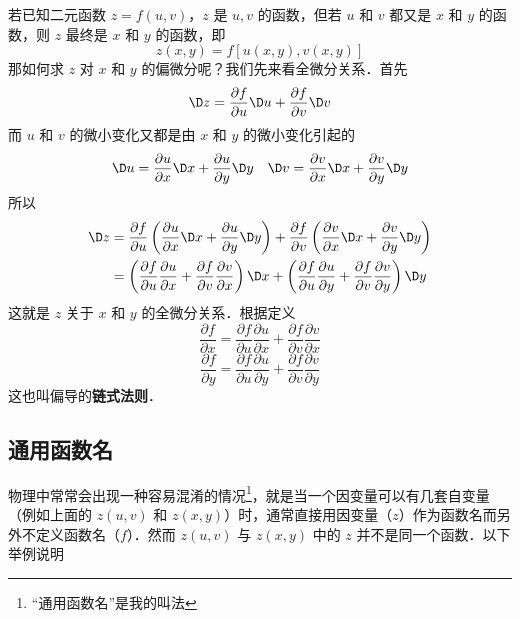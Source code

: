 
若已知二元函数 $z = f(u,v)$，$z$ 是 $u, v$ 的函数，但若 $u$ 和 $v$ 都又是 $x$ 和 $y$ 的函数，则 $z$ 最终是 $x$ 和 $y$ 的函数，即
\begin{equation}
z(x,y) = f[u(x,y),v(x,y)]
\end{equation}
那如何求 $z$ 对 $x$ 和 $y$ 的偏微分呢？我们先来看全微分关系．首先
\begin{equation}
\D z = \frac{{\partial f}}{{\partial u}}\D u + \frac{{\partial f}}{{\partial v}}\D v
\end{equation}
而 $u$ 和 $v$ 的微小变化又都是由 $x$ 和 $y$ 的微小变化引起的
\begin{equation}
\D u = \frac{{\partial u}}{{\partial x}}\D x + \frac{{\partial u}}{{\partial y}}\D y
\quad
\D v = \frac{{\partial v}}{{\partial x}}\D x + \frac{{\partial v}}{{\partial y}}\D y
\end{equation}
所以
\begin{equation}
\begin{aligned}
\D z &= \frac{{\partial f}}{{\partial u}}\left( {\frac{{\partial u}}{{\partial x}}\D x + \frac{{\partial u}}{{\partial y}}\D y} \right) + \frac{{\partial f}}{{\partial v}}\left( {\frac{{\partial v}}{{\partial x}}\D x + \frac{{\partial v}}{{\partial y}}\D y} \right) \hfill \\
   &= \left( {\frac{{\partial f}}{{\partial u}}\frac{{\partial u}}{{\partial x}} + \frac{{\partial f}}{{\partial v}}\frac{{\partial v}}{{\partial x}}} \right)\D x + \left( {\frac{{\partial f}}{{\partial u}}\frac{{\partial u}}{{\partial y}} + \frac{{\partial f}}{{\partial v}}\frac{{\partial v}}{{\partial y}}} \right) \D y
\end{aligned}
\end{equation}
这就是 $z$ 关于 $x$ 和 $y$ 的全微分关系．根据定义
\begin{equation}
\frac{{\partial f}}{{\partial x}} = \frac{{\partial f}}{{\partial u}}\frac{{\partial u}}{{\partial x}} + \frac{{\partial f}}{{\partial v}}\frac{{\partial v}}{{\partial x}}
\end{equation}
\begin{equation}
\frac{{\partial f}}{{\partial y}} = \frac{{\partial f}}{{\partial u}}\frac{{\partial u}}{{\partial y}} + \frac{{\partial f}}{{\partial v}}\frac{{\partial v}}{{\partial y}}
\end{equation}
这也叫偏导的\textbf{链式法则}．

\subsection{通用函数名}
物理中常常会出现一种容易混淆的情况\footnote{“通用函数名”是我的叫法}，就是当一个因变量可以有几套自变量（例如上面的 $z(u,v)$ 和 $z(x,y)$）时，通常直接用因变量（$z$）作为函数名而另外不定义函数名（$f$）．然而 $z(u,v)$ 与 $z(x,y)$ 中的 $z$ 并不是同一个函数．以下举例说明

